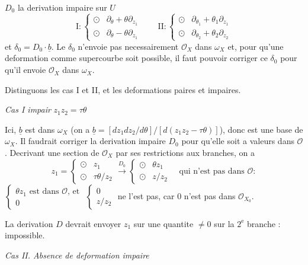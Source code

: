 \documentclass[11pt,a4paper]{article}
\theoremstyle{plain}
\theoremstyle{definition}
\begin{document}
$D_0$ la derivation impaire sur $U$
\[
\text{I} : \begin{cases} \odot & \partial_\theta + \theta\partial_{z_1} \\ \odot & \partial_\theta - \theta\partial_{z_1} \end{cases} \qquad
\text{II} : \begin{cases} \odot & \partial_{\theta_1} + \theta_1\partial_{z_1} \\ \odot & \partial_{\theta_2} + \theta_2\partial_{z_2} \end{cases}
\]
et $\delta_0 = D_0 \cdot \underline{b}$. Le $\delta_0$ n'envoie pas necessairement $\mathcal{O}_X$ dans $\omega_X$ et, pour qu'une deformation comme supercourbe soit possible, il faut pouvoir corriger ce $\delta_0$ pour qu'il envoie $\mathcal{O}_X$ dans $\omega_X$.

Distinguons les cas I et II, et les deformations paires et impaires.

\medskip

\noindent \textit{Cas I impair} \hfill $z_1 z_2 = \tau \theta$

Ici, $\underline{b}$ est dans $\omega_X$ (on a $\underline{b} = [dz_1 dz_2/d\theta] / [d(z_1 z_2 - \tau\theta)]$), donc est une base de $\omega_X$. Il faudrait corriger la derivation impaire $D_0$ pour qu'elle soit a valeurs dans $\mathcal{O}$. Decrivant une section de $\mathcal{O}_X$ par ses restrictions aux branches, on a
\[
z_1 = \begin{cases} \odot & z_1 \\ \odot & \tau\theta/z_2 \end{cases} \xrightarrow{D_0}
\begin{cases} \odot & \theta z_1 \\ \odot & z/z_2 \end{cases} \quad \text{qui n'est pas dans } \mathcal{O} :
\]
$\begin{cases} \theta z_1 \text{ est dans } \mathcal{O}\text{, et} \\ 0 \end{cases}$ $\begin{cases} 0 \\ z/z_2 \end{cases}$ ne l'est pas, car $0$ n'est pas dans $\mathcal{O}_{X_0}$.

La derivation $D$ devrait envoyer $z_1$ sur une quantite $\neq 0$ sur la $2^{\text{e}}$ branche : impossible.

\newpage

\noindent \textit{Cas II. Absence de deformation impaire}
\end{document}
